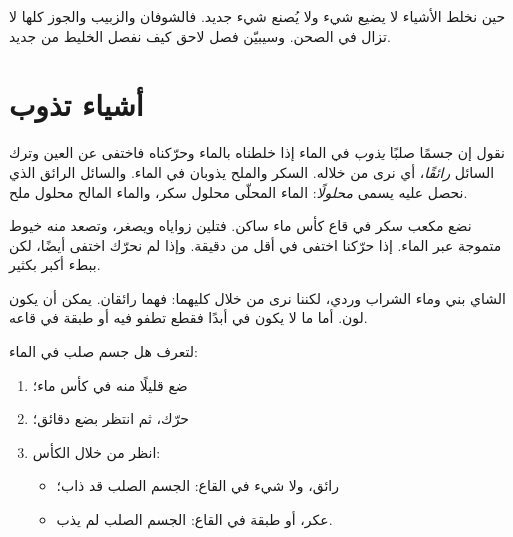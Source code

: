 \begin{remark}\label{rem:g2:mixing-and-dissolving:nothing-lost}
حين نخلط الأشياء لا يضيع شيء ولا يُصنع شيء جديد. فالشوفان والزبيب
والجوز كلها لا تزال في الصحن. وسيبيّن فصل لاحق كيف نفصل الخليط من
جديد.
\end{remark}

\section{أشياء تذوب}

\begin{definition}\label{def:g2:mixing-and-dissolving:dissolve}
نقول إن جسمًا صلبًا \emph{يذوب} في الماء إذا خلطناه بالماء
وحرّكناه فاختفى عن العين وترك السائل \emph{رائقًا}، أي نرى من خلاله.
السكر والملح يذوبان في الماء. والسائل الرائق الذي نحصل عليه يسمى
\emph{محلولًا}: الماء المحلّى محلول سكر، والماء المالح
محلول ملح.
\end{definition}

\begin{example}\label{ex:g2:mixing-and-dissolving:cube}
نضع مكعب سكر في قاع كأس ماء ساكن. فتلين زواياه ويصغر، وتصعد منه
خيوط متموجة عبر الماء. إذا حرّكنا اختفى في أقل من دقيقة. وإذا لم
نحرّك اختفى أيضًا، لكن ببطء أكبر بكثير.
\end{example}

\begin{remark}\label{rem:g2:mixing-and-dissolving:clear}
الشاي بني وماء الشراب وردي، لكننا نرى من خلال كليهما: فهما رائقان.
يمكن أن يكون  لون. أما ما لا يكون في  أبدًا فقطع تطفو
فيه أو طبقة في قاعه.
\end{remark}

\begin{method}[هل يذوب؟]\label{met:g2:mixing-and-dissolving:test}
لتعرف هل  جسم صلب في الماء:
\begin{enumerate}
  \item ضع قليلًا منه في كأس ماء؛
  \item حرّك، ثم انتظر بضع دقائق؛
  \item انظر من خلال الكأس:
    \begin{itemize}
      \item رائق، ولا شيء في القاع: الجسم الصلب قد ذاب؛
      \item عكر، أو طبقة في القاع: الجسم الصلب لم يذب.
    \end{itemize}
\end{enumerate}
\end{method}

